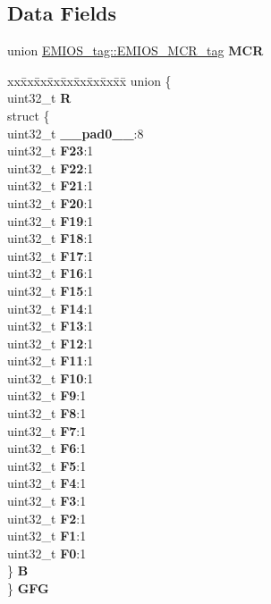 \subsection*{Data Fields}
\begin{DoxyCompactItemize}
\item 
\mbox{\label{structEMIOS__tag_affd4bbe4a6d7ac1492efa0ad8b3faede}} 
union \mbox{\hyperlink{unionEMIOS__tag_1_1EMIOS__MCR__tag}{E\+M\+I\+O\+S\+\_\+tag\+::\+E\+M\+I\+O\+S\+\_\+\+M\+C\+R\+\_\+tag}} {\bfseries M\+CR}
\item 
\mbox{\label{structEMIOS__tag_af0471d9cac09bf314d6da24852dc19c4}} 
\begin{tabbing}
xx\=xx\=xx\=xx\=xx\=xx\=xx\=xx\=xx\=\kill
union \{\\
\>uint32\_t {\bfseries R}\\
\>struct \{\\
\>\>uint32\_t {\bfseries \_\_pad0\_\_}:8\\
\>\>uint32\_t {\bfseries F23}:1\\
\>\>uint32\_t {\bfseries F22}:1\\
\>\>uint32\_t {\bfseries F21}:1\\
\>\>uint32\_t {\bfseries F20}:1\\
\>\>uint32\_t {\bfseries F19}:1\\
\>\>uint32\_t {\bfseries F18}:1\\
\>\>uint32\_t {\bfseries F17}:1\\
\>\>uint32\_t {\bfseries F16}:1\\
\>\>uint32\_t {\bfseries F15}:1\\
\>\>uint32\_t {\bfseries F14}:1\\
\>\>uint32\_t {\bfseries F13}:1\\
\>\>uint32\_t {\bfseries F12}:1\\
\>\>uint32\_t {\bfseries F11}:1\\
\>\>uint32\_t {\bfseries F10}:1\\
\>\>uint32\_t {\bfseries F9}:1\\
\>\>uint32\_t {\bfseries F8}:1\\
\>\>uint32\_t {\bfseries F7}:1\\
\>\>uint32\_t {\bfseries F6}:1\\
\>\>uint32\_t {\bfseries F5}:1\\
\>\>uint32\_t {\bfseries F4}:1\\
\>\>uint32\_t {\bfseries F3}:1\\
\>\>uint32\_t {\bfseries F2}:1\\
\>\>uint32\_t {\bfseries F1}:1\\
\>\>uint32\_t {\bfseries F0}:1\\
\>\} {\bfseries B}\\
\} {\bfseries GFG}\\


\end{tabbing}
\end{DoxyCompactItemize}
